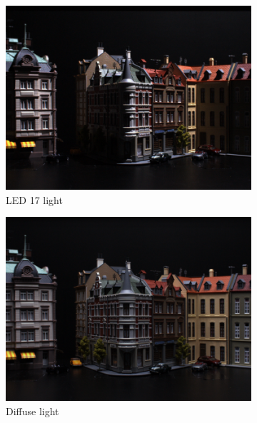 \documentclass[thesis.tex]{subfiles}
\begin{document}
\begin{figure}[tb]
\begin{subfigure}[t]{0.32\textwidth}
		\includegraphics[width=\textwidth]{img/scene_04_img60_17.png}
		\caption{LED 17 light}
		\label{fig:light_example_17}
	\end{subfigure}
	\begin{subfigure}[t]{0.32\textwidth}
		\includegraphics[width=\textwidth]{img/scene_04_img60_00.png}
		\caption{Diffuse light}
		\label{fig:light_example_00}
	\end{subfigure}
	\begin{subfigure}[t]{0.32\textwidth}

\end{subfigure}
\end{figure}
\end{document}
